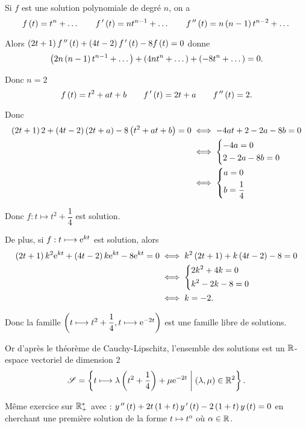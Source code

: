 \begin{corr}
Si \(f\) est une solution polynomiale de degré \(n\), on a \[f\left(t\right)=t^n+\dots\qquad f^{\,\prime}\left(t\right)=nt^{n-1}+\dots\qquad f^{\,\prime\prime}\left(t\right)=n\left(n-1\right)t^{n-2}+\dots\]

Alors \(\left(2t+1\right)f^{\,\prime\prime}\left(t\right)+\left(4t-2\right)f^{\,\prime}\left(t\right)-8f\left(t\right)=0\) donne \[\left(2n\left(n-1\right)t^{n-1}+\dots\right)+\left(4nt^n+\dots\right)+\left(-8t^n+\dots\right)=0.\]

Donc \(n=2\) \ie \[f\left(t\right)=t^2+at+b\qquad f^{\,\prime}\left(t\right)=2t+a\qquad f^{\,\prime\prime}\left(t\right)=2.\]

Donc \[\begin{aligned}
\left(2t+1\right)2+\left(4t-2\right)\left(2t+a\right)-8\left(t^2+at+b\right)=0&\iff-4at+2-2a-8b=0 \\
&\iff\begin{dcases}
-4a=0 \\
2-2a-8b=0
\end{dcases} \\
&\iff\begin{dcases}
a=0 \\
b=\dfrac{1}{4}
\end{dcases}
\end{aligned}\]

Donc \(f:t\mapsto t^2+\dfrac{1}{4}\) est solution.

De plus, si \(f:t\longmapsto\mathrm{e}^{kt}\) est solution, alors \[\begin{aligned}
\left(2t+1\right)k^2\mathrm{e}^{kt}+\left(4t-2\right)k\mathrm{e}^{kt}-8\mathrm{e}^{kt}=0&\iff k^2\left(2t+1\right)+k\left(4t-2\right)-8=0 \\
&\iff\begin{dcases}
2k^2+4k=0 \\
k^2-2k-8=0
\end{dcases} \\
&\iff k=-2.
\end{aligned}\]

Donc la famille \(\left(t\longmapsto t^2+\dfrac{1}{4},t\longmapsto\mathrm{e}^{-2t}\right)\) est une famille libre de solutions.

Or d'après le théorème de Cauchy-Lipschitz, l'ensemble des solutions est un \(\mathbb{R}\)-espace vectoriel de dimension \(2\) \ie \[\mathscr{S}=\left\lbrace t\longmapsto\lambda\left(t^2+\dfrac{1}{4}\right)+\mu\mathrm{e}^{-2t}\;\middle|\;\left(\lambda,\mu\right)\in\mathbb{R}^2\right\rbrace.\]
\end{corr}

\begin{exo}
Même exercice sur \(\mathbb{R}_+^*\) avec : \(y^{\,\prime\prime}\left(t\right)+2t\left(1+t\right)y^{\,\prime}\left(t\right)-2\left(1+t\right)y\left(t\right)=0\) en cherchant une première solution de la forme \(t\mapsto t^\alpha\) où \(\alpha\in\mathbb{R}\).
\end{exo}

